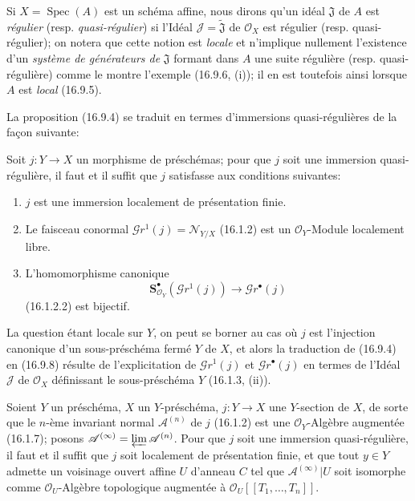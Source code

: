\begin{env}[16.9.7]
Si $X=\operatorname{Spec}(A)$ est un schéma affine, nous dirons qu'un idéal
$\mathfrak{J}$ de $A$ est \emph{régulier} (resp. \emph{quasi-régulier}) si l'Idéal
$\mathscr{J}=\widetilde{\mathfrak{J}}$ de $\mathcal{O}_X$ est régulier
(resp. quasi-régulier); on notera que cette notion est \emph{locale} et n'implique
nullement l'existence d'un \emph{système de générateurs de} $\mathfrak{J}$ formant
dans $A$ une suite régulière (resp. quasi-régulière) comme le montre l'exemple
(16.9.6, (i)); il en est toutefois ainsi lorsque $A$ est \emph{local} (16.9.5).

La proposition (16.9.4) se traduit en termes d'immersions quasi-régulières de
la façon suivante:
\end{env}

\begin{proposition}[16.9.8]
\label{IV.16.9.8}
Soit $j:Y\to X$ un morphisme de préschémas; pour que $j$ soit une immersion
quasi-régulière, il faut et il suffit que $j$ satisfasse aux conditions
suivantes:
\begin{enumerate}
  \item[\textup{(i)}] $j$ est une immersion localement de présentation finie.
  \item[\textup{(ii)}] Le faisceau conormal
  $\mathscr{G}r^1(j)=\mathcal{N}_{Y/X}$ \textup{(16.1.2)} est un
  $\mathcal{O}_Y$-Module localement libre.
  \item[\textup{(iii)}] L'homomorphisme canonique
  \[
    \mathbf{S}_{\mathcal{O}_Y}^{\bullet}
      (\mathscr{G}r^1(j))\longrightarrow\mathscr{G}r^{\bullet}(j)
  \]
  \textup{(16.1.2.2)} est bijectif.
\end{enumerate}
\end{proposition}

La question étant locale sur $Y$, on peut se borner au cas où $j$ est
l'injection canonique d'un sous-préschéma fermé $Y$ de $X$, et alors la
traduction de (16.9.4) en (16.9.8) résulte de l'explicitation de
$\mathscr{G}r^1(j)$ et $\mathscr{G}r^{\bullet}(j)$ en termes de
l'Idéal $\mathscr{J}$ de $\mathcal{O}_X$ définissant le sous-préschéma $Y$
(16.1.3, (ii)).

\begin{corollary}[16.9.9]
\label{IV.16.9.9}
Soient $Y$ un préschéma, $X$ un $Y$-préschéma, $j:Y\to X$ une $Y$-section
de $X$, de sorte que le $n$-ème invariant normal $\mathscr{A}^{(n)}$ de $j$
\textup{(16.1.2)} est une $\mathcal{O}_Y$-Algèbre augmentée \textup{(16.1.7)}; posons
$\mathscr{A}^{(\infty)}=\varprojlim\mathscr{A}^{(n)}$. Pour que $j$ soit une
immersion quasi-régulière, il faut et il suffit que $j$ soit localement de
présentation finie, et que tout $y\in Y$ admette un voisinage ouvert affine
$U$ d'anneau $C$ tel que $\mathscr{A}^{(\infty)}|U$ soit isomorphe comme
$\mathcal{O}_U$-Algèbre topologique augmentée à
$\mathcal{O}_U[[T_1,\ldots,T_n]]$.
\end{corollary}

